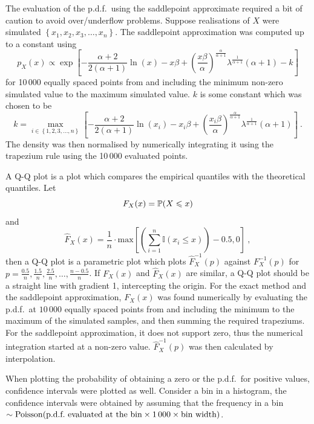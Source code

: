 The evaluation of the p.d.f.~using the saddlepoint approximate required a bit of caution to avoid over/underflow problems. Suppose realisations of $X$ were simulated $\left\{x_1,x_2,x_3,\dotsc,x_n\right\}$. The saddlepoint approximation was computed up to a constant using
\begin{equation}
  p_X(x) \propto
  \exp\left[
    -\frac{\alpha+2}{2(\alpha+1)}
    \ln(x)
    -x\beta
    +\left(
    \frac{x\beta}{\alpha}
    \right)^{\frac{\alpha}{\alpha+1}}\lambda^{\frac{1}{\alpha+1}}(\alpha+1) - k
  \right]
\end{equation}
for 10\,000 equally spaced points from and including the minimum non-zero simulated value to the maximum simulated value. $k$ is some constant which was chosen to be
\begin{equation}
  k =
  \max_{i\in\left\{1,2,3,\dotsc,n\right\}}
  \left[
    -\frac{\alpha+2}{2(\alpha+1)}
    \ln(x_i)
    -x_i\beta
    +\left(
      \frac{x_i\beta}{\alpha}
    \right)^{\frac{\alpha}{\alpha+1}}\lambda^{\frac{1}{\alpha+1}}(\alpha+1)
  \right]
  \ .
\end{equation}
The density was then normalised by numerically integrating it using the trapezium rule using the 10\,000 evaluated points.

A Q-Q plot is a plot which compares the empirical quantiles with the theoretical quantiles. Let
\begin{equation}
  F_X(x) = \operatorname{\mathbb{P}}(X\leqslant x)
\end{equation}
and
\begin{equation}
  \widehat{F}_X(x) = \frac{1}{n}\cdot\text{max}
  \left[
    \left(\sum_{i=1}^n\mathbb{I}(x_i\leqslant x)\right)-0.5,0
  \right]
  \ ,
\end{equation}
then a Q-Q plot is a parametric plot which plots $\widehat{F}_X^{-1}(p)$ against $F_X^{-1}(p)$ for $p=\frac{0.5}{n},\frac{1.5}{n},\frac{2.5}{n},\dotsc,\frac{n-0.5}{n}$. If $F_X(x)$ and $\widehat{F}_X(x)$ are similar, a Q-Q plot should be a straight line with gradient 1, intercepting the origin. For the exact method and the saddlepoint approximation, $F_X(x)$ was found numerically by evaluating the p.d.f.~at $10\,000$ equally spaced points from and including the minimum to the maximum of the simulated samples, and then summing the required trapeziums. For the saddlepoint approximation, it does not support zero, thus the numerical integration started at a non-zero value. $\widehat{F}_X^{-1}(p)$ was then calculated by interpolation.

When plotting the probability of obtaining a zero or the p.d.f.~for positive values, confidence intervals were plotted as well. Consider a bin in a histogram, the confidence intervals were obtained by assuming that the frequency in a bin $\sim\operatorname{Poisson}(\text{p.d.f.~evaluated at the bin}\times 1\,000 \times \text{bin width})$.

